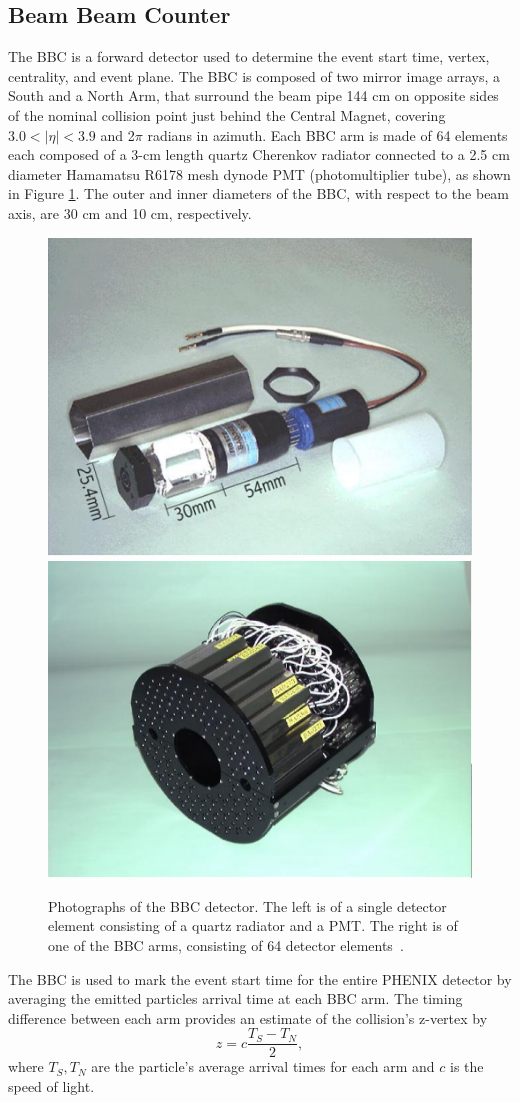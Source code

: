 \subsection{Beam Beam Counter}
The BBC is a forward detector used to determine the event start time, vertex, centrality, and event plane. The BBC is composed of two mirror image arrays, a South and a North Arm, that surround the beam pipe 144 cm on opposite sides of the nominal collision point just behind the Central Magnet, covering $3.0 < |\eta| < 3.9$ and 2$\pi$ radians in azimuth. Each BBC arm is made of 64 elements each composed of a 3-cm length quartz Cherenkov radiator connected to a 2.5 cm diameter Hamamatsu R6178 mesh dynode PMT (photomultiplier tube), as shown in Figure \ref{fig:bbc_dector}. The outer and inner diameters of the BBC, with respect to the beam axis, are 30 cm and 10 cm, respectively.%
\begin{figure}[!ht]
\begin{center}
\includegraphics[width=0.45\linewidth]{figs/bbc_pmt.png}
\includegraphics[width=0.45\linewidth]{figs/bbc_arm.png}
\caption{Photographs of the BBC detector. The left is of a single detector element consisting of a quartz radiator and a PMT. The right is of one of the BBC arms, consisting of 64 detector elements~\cite{Adcox2003469}.}
\label{fig:bbc_dector}
\end{center}
\end{figure}

The BBC is used to mark the event start time for the entire PHENIX detector by averaging the emitted particles arrival time at each BBC arm. The timing difference between each arm provides an estimate of the collision's z-vertex by
\begin{equation}
z = c \frac{T_S - T_N}{2},
\end{equation}
where $T_S, T_N$ are the particle's average arrival times for each arm and $c$ is the speed of light.%


